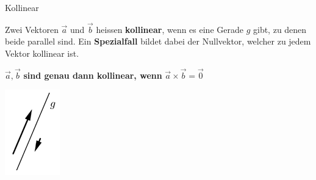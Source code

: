 \begin{definition}{Kollinear}
    
    \begin{minipage}
        {0.85\linewidth}
        Zwei Vektoren $\vec{a}$ und $\vec{b}$ heissen \textbf{kollinear}, 
        wenn es eine Gerade $g$ gibt, zu denen beide parallel sind. 
        Ein \textbf{Spezialfall} bildet dabei der Nullvektor, welcher zu jedem Vektor kollinear ist.

        $\vec{a}, \vec{b}$ \textbf{ sind genau dann kollinear, wenn } $\vec{a}\times\vec{b}=\vec{0}$
    \end{minipage}
    \hspace{1mm}
    \begin{minipage}{0.1\linewidth}
        \includegraphics[width=\linewidth]{vec-kollinear.png}
    \end{minipage}
\end{definition}


